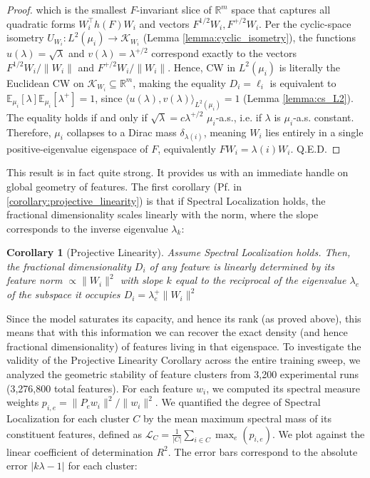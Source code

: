 \documentclass{article}
\theoremstyle{plain}
\newtheorem{corollary}[theorem]{Corollary}
\numberwithin{equation}{section}
\theoremstyle{definition}
\theoremstyle{remark}
\begin{document}
\begin{lemmaproofbox}
\begin{proof}
which is the smallest $F$-invariant slice of $\mathbb{R}^m$ space that captures all quadratic forms $W_i^\top h(F)W_i$ and vectors $F^{1/2}W_i, F^{+/2}W_i$. Per the cyclic-space isometry $U_{W_i}: L^2(\mu_i)\rightarrow \mathcal{K}_{W_i}$ (Lemma \ref{lemma:cyclic_isometry}), the functions $u(\lambda) = \sqrt{\lambda}$ and $v(\lambda) = \lambda^{+/2}$ correspond exactly to the vectors $F^{1/2}W_i/\|W_i\|$ and $F^{+/2}W_i/\|W_i\|$. Hence, CW in $L^2(\mu_i)$ is literally the Euclidean CW on $\mathcal{K}_{W_i}\subseteq\mathbb{R}^m$, making the equality $D_i=\ell_i$ is equivalent to $\mathbb{E}_{\mu_i}[\lambda]\mathbb{E}_{\mu_i}[\lambda^{+}]=1$, since $\langle u(\lambda), v(\lambda)\rangle_{L^2(\mu_i)} = 1$ (Lemma \ref{lemma:cs_L2}). The equality holds if and only if $\sqrt \lambda = c\lambda^{+/2}$ $\mu_i$-a.s., i.e. if $\lambda$ is $\mu_i$-a.s. constant. Therefore, $\mu_i$ collapses to a Dirac mass $\delta_{\lambda(i)}$, meaning $W_i$ lies entirely in a single positive-eigenvalue eigenspace of $F$,
equivalently $FW_i=\lambda(i)W_i$. Q.E.D.
\end{proof}
\end{lemmaproofbox}
This result is in fact quite strong. It provides us with an immediate handle on global geometry of features. The first corollary (Pf. in \ref{corollary:projective_linearity}) is that if Spectral Localization holds, the fractional dimensionality scales linearly with the norm, where the slope corresponds to the inverse eigenvalue $\lambda_k$:
\begin{corollary} [Projective Linearity]
    \label{corollary:projective_linearity_section4}
    Assume Spectral Localization holds. Then, the fractional dimensionality $D_i$ of any feature is linearly determined by its feature norm $\propto \|W_i\|^2$ with slope $k$ equal to the reciprocal of the eigenvalue $\lambda_e$ of the subspace it occupies $D_i = \lambda_e^+ \|W_i\|^2$
\end{corollary}
Since the model saturates its capacity, and hence its rank (as proved above), this means that with this information we can recover the exact density (and hence fractional dimensionality) of features living in that eigenspace. To investigate the validity of the Projective Linearity Corollary across the entire training sweep, we analyzed the geometric stability of feature clusters from 3,200 experimental runs (3,276,800 total features). For each feature $w_i$, we computed its spectral measure weights $p_{i,e} = \|P_e w_i\|^2 / \|w_i\|^2$. We quantified the degree of Spectral Localization for each cluster $C$ by the mean maximum spectral mass of its constituent features, defined as $\mathcal{L}_C = \frac{1}{|C|} \sum_{i \in C} \max_e (p_{i,e})$. We plot against the linear coefficient of determination $R^2$. The error bars correspond to the absolute error $|k\lambda -1|$ for each cluster:
\end{document}
